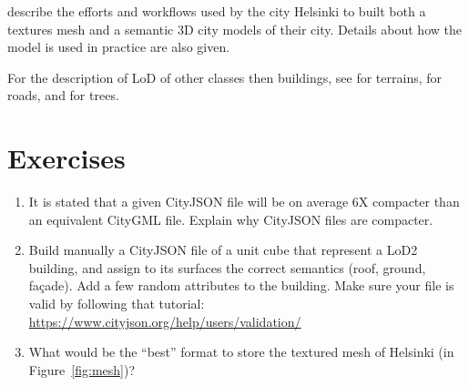 \citet{Helsinki19} describe the efforts and workflows used by the city Helsinki to built both a textures mesh and a semantic 3D city models of their city. 
Details about how the model is used in practice are also given.

For the description of LoD of other classes then buildings, see \citet{Kumar19} for terrains, \citet{Labetski18} for roads, and \citet{Ortega18} for trees.

%
\section{Exercises}

\begin{enumerate}
  \item It is stated that a given CityJSON file will be on average 6X compacter than an equivalent CityGML file. Explain why CityJSON files are compacter.
  \item Build manually a CityJSON file of a unit cube that represent a LoD2 building, and assign to its surfaces the correct semantics (roof, ground, façade). Add a few random attributes to the building. Make sure your file is valid by following that tutorial: \url{https://www.cityjson.org/help/users/validation/}
  \item What would be the ``best'' format to store the textured mesh of Helsinki (in Figure~\ref{fig:mesh})?
\end{enumerate}








